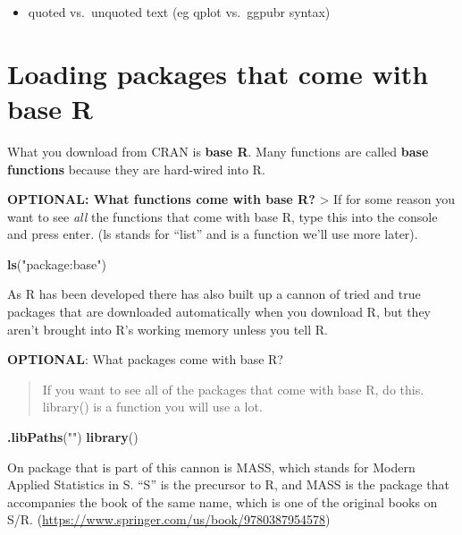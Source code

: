 \documentclass[]{book}
\newenvironment{Shaded}{\begin{snugshade}}{\end{snugshade}}
\newcommand{\KeywordTok}[1]{\textcolor[rgb]{0.13,0.29,0.53}{\textbf{#1}}}
\newcommand{\StringTok}[1]{\textcolor[rgb]{0.31,0.60,0.02}{#1}}
\newcommand{\NormalTok}[1]{#1}
\providecommand{\tightlist}{%
  \setlength{\itemsep}{0pt}\setlength{\parskip}{0pt}}
\theoremstyle{definition}
\theoremstyle{definition}
\theoremstyle{definition}
\theoremstyle{remark}
\begin{document}
\begin{itemize}
\tightlist
\item
  quoted vs.~unquoted text (eg qplot vs.~ggpubr syntax)
\end{itemize}

\section{Loading packages that come with base
R}\label{loading-packages-that-come-with-base-r}

What you download from CRAN is \textbf{base R}. Many functions are
called \textbf{base functions} because they are hard-wired into R.

\textbf{OPTIONAL: What functions come with base R?} \textgreater{} If
for some reason you want to see \emph{all} the functions that come with
base R, type this into the console and press enter. (ls stands for
``list'' and is a function we'll use more later).

\begin{Shaded}
\begin{Highlighting}[]
\KeywordTok{ls}\NormalTok{(}\StringTok{"package:base"}\NormalTok{)}
\end{Highlighting}
\end{Shaded}

As R has been developed there has also built up a cannon of tried and
true packages that are downloaded automatically when you download R, but
they aren't brought into R's working memory unless you tell R.

\textbf{OPTIONAL}: What packages come with base R?

\begin{quote}
If you want to see all of the packages that come with base R, do this.
library() is a function you will use a lot.
\end{quote}

\begin{Shaded}
\begin{Highlighting}[]
\KeywordTok{.libPaths}\NormalTok{(}\StringTok{""}\NormalTok{) }
\KeywordTok{library}\NormalTok{()}
\end{Highlighting}
\end{Shaded}

On package that is part of this cannon is MASS, which stands for Modern
Applied Statistics in S. ``S'' is the precursor to R, and MASS is the
package that accompanies the book of the same name, which is one of the
original books on S/R.
(\url{https://www.springer.com/us/book/9780387954578})
\end{document}
